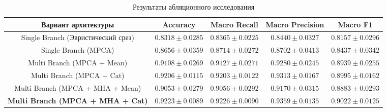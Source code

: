 \begin{table}[htbp]
\centering
\scriptsize
\renewcommand{\arraystretch}{1.15}
\begin{tabular}{ccccc}
\toprule
\textbf{Вариант архитектуры} & \textbf{Accuracy} & \textbf{Macro Recall} & \textbf{Macro Precision} & \textbf{Macro F1} \\
\midrule
Single Branch (Эвристический срез) & $0.8318 \pm 0.0285$ & $0.8365 \pm 0.0225$ & $0.8440 \pm 0.0327$ & $0.8157 \pm 0.0296$ \\
Single Branch (MPCA) & $0.8656 \pm 0.0359$ & $0.8714 \pm 0.0272$ & $0.8702 \pm 0.0413$ & $0.8437 \pm 0.0342$ \\
Multi Branch (MPCA + Mean) & $0.9108 \pm 0.0269$ & $0.9127 \pm 0.0271$ & $0.9280 \pm 0.0245$ & $0.8939 \pm 0.0255$ \\
Multi Branch (MPCA + Cat) & $0.9206 \pm 0.0115$ & $0.9203 \pm 0.0122$ & $0.9313 \pm 0.0167$ & $0.8995 \pm 0.0162$ \\
Multi Branch (MPCA + MHA + Mean) & $0.9053 \pm 0.0279$ & $0.9056 \pm 0.0292$ & $0.9170 \pm 0.0315$ & $0.8883 \pm 0.0293$ \\
\textbf{Multi Branch (MPCA + MHA + Cat)} & $\mathbf{0.9223 \pm 0.0089}$ & $\mathbf{0.9226 \pm 0.0090}$ & $\mathbf{0.9359 \pm 0.0135}$ & $\mathbf{0.9022 \pm 0.0125}$ \\
\bottomrule
\end{tabular}
\caption{Результаты абляционного исследования}
\label{tab:ablation}
\end{table}
